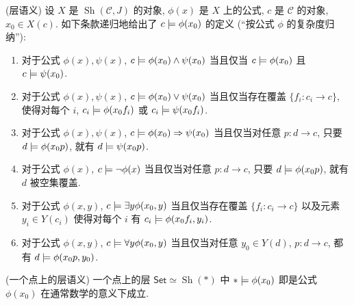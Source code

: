 \begin{propdef}
	[label={sheaf-semantics-inductive}]
	{(层语义)}
	设 $X$ 是 $\operatorname{Sh}(\mathcal C,J)$ 的对象, $\phi(x)$ 是 $X$ 上的公式, $c$ 是 $\mathcal C$ 的对象, $x_0 \in X(c)$. 如下条款递归地给出了 $c\models\phi(x_0)$ 的定义 (``按公式 $\phi$ 的复杂度归纳''):
	\begin{enumerate}[(1)]
		\item 对于公式 $\phi(x), \psi(x)$, $c\models \phi(x_0) \land \psi(x_0)$ 当且仅当 $c\models \phi(x_0)$ 且 $c\models\psi(x_0)$.
		\item 对于公式 $\phi(x), \psi(x)$, $c\models \phi(x_0) \lor \psi(x_0)$ 当且仅当存在覆盖 $\{f_i\colon c_i\to c\}$, 使得对每个 $i$, $c_i\models \phi(x_0 f_i)$ 或 $c_i\models\psi(x_0 f_i)$.
		\item 对于公式 $\phi(x), \psi(x)$, $c\models \phi(x_0) \Rightarrow \psi(x_0)$ 当且仅当对任意 $p\colon d\to c$, 只要 $d\models \phi(x_0 p)$, 就有 $d\models \psi(x_0p)$.
		\item 对于公式 $\phi(x)$, $c\models \neg\phi(x)$ 当且仅当对任意 $p\colon d\to c$, 只要 $d\models\phi(x_0p)$, 就有 $d$ 被空集覆盖.
		\item \label{sheaf-semantics-exists}对于公式 $\phi(x,y)$, $c \models \exists y \phi(x_0,y)$ 当且仅当存在覆盖 $\{f_i\colon c_i\to c\}$ 以及元素 $y_i\in Y(c_i)$ 使得对每个 $i$ 有 $c_i\models \phi(x_0f_i,y_i)$.
		\item 对于公式 $\phi(x,y)$, $c \models \forall y \phi(x_0,y)$ 当且仅当对任意 $y_0\in Y(d)$, $p\colon d\to c$, 都有 $d\models \phi(x_0p,y_0)$.
	\end{enumerate}
\end{propdef}

\begin{example}
	{(一个点上的层语义)}
	一个点上的层\topos{} $\mathsf {Set} \simeq \operatorname{Sh}(*)$ 中 $*\models\phi(x_0)$ 即是公式 $\phi(x_0)$ 在通常数学的意义下成立.
\end{example}

